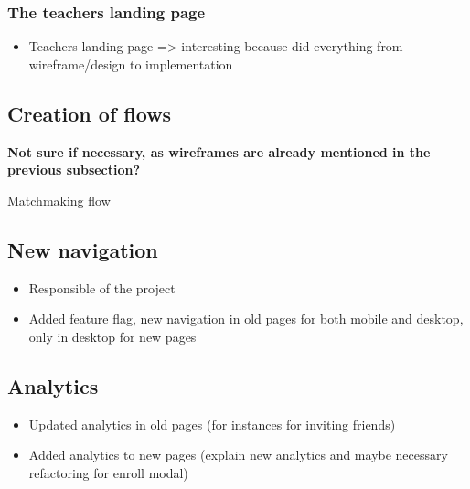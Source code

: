 \subsubsection{The teachers landing page}
\label{sssec:teachersPage}

\begin{itemize}
    \item Teachers landing page => interesting because did everything from wireframe/design to implementation
\end{itemize}

\subsection{Creation of flows}
\label{ssec:flows}

\textbf{Not sure if necessary, as wireframes are already mentioned in the previous subsection?}

Matchmaking flow

\subsection{New navigation}
\label{ssec:new_nav}

\begin{itemize}
    \item Responsible of the project
    \item Added feature flag, new navigation in old pages for both mobile and desktop, only in desktop for new pages
\end{itemize}

\subsection{Analytics}
\label{ssec:analytics}

\begin{itemize}
    \item Updated analytics in old pages (for instances for inviting friends)
    \item Added analytics to new pages (explain new analytics and maybe necessary refactoring for enroll modal)
\end{itemize}
